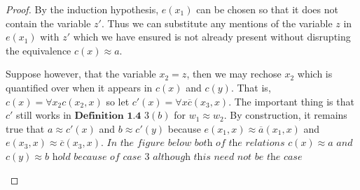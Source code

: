 \documentclass{article}
\theoremstyle{problemstyle}
\theoremstyle{lemmastyle}
\theoremstyle{theoremstyle}
\theoremstyle{problemstyle}
\begin{document}
\begin{proof}
By the induction hypothesis, $e(x_1)$ can be chosen so that it does not contain the variable $z'$. Thus we can substitute any mentions of the variable $z$ in $e(x_1)$ with $z'$ which we have ensured is not already present without disrupting the equivalence $c(x) \approx a$.  

Suppose however, that the variable $x_2 = z$, then we may rechose $x_2$ which is quantified over when it appears in $c(x)$ and $c(y)$. That is, $c(x) = \forall x_2c(x_2,x)$ so let $c'(x) = \forall x\overline{c}(x_3,x)$. The important thing is that $c'$ still works in $\textbf{Definition 1.4}$ $3 (b)$ for $w_1 \approx w_2$. By construction, it remains true that $a \approx c'(x)$ and $b \approx c'(y)$ because $e(x_1, x) \approx \overline{a}(x_1, x)$ and $e(x_3,x) \approx \overline{c}(x_3,x)$. $\textit{In the figure below both of the relations}$ $c(x) \approx a$ $\textit{and}$ $c(y) \approx b$ $\textit{hold because of case 3 although this need not be the case}$

\begin{flushleft}
\end{flushleft}
\end{proof}
\end{document}
